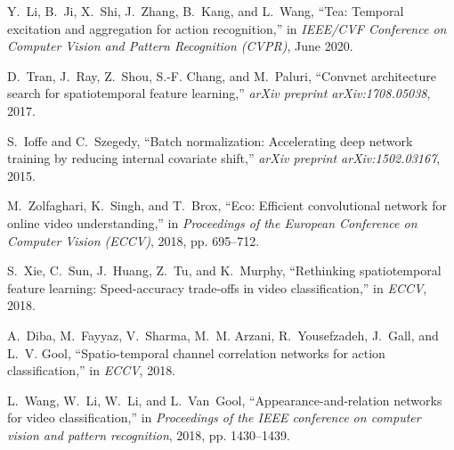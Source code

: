 \documentclass[journal]{IEEEtran}
\begin{document}
\begin{thebibliography}{10}
Y.~Li, B.~Ji, X.~Shi, J.~Zhang, B.~Kang, and L.~Wang, ``Tea: Temporal
  excitation and aggregation for action recognition,'' in \emph{IEEE/CVF
  Conference on Computer Vision and Pattern Recognition (CVPR)}, June 2020.

D.~Tran, J.~Ray, Z.~Shou, S.-F. Chang, and M.~Paluri, ``Convnet architecture
  search for spatiotemporal feature learning,'' \emph{arXiv preprint
  arXiv:1708.05038}, 2017.

S.~Ioffe and C.~Szegedy, ``Batch normalization: Accelerating deep network
  training by reducing internal covariate shift,'' \emph{arXiv preprint
  arXiv:1502.03167}, 2015.

M.~Zolfaghari, K.~Singh, and T.~Brox, ``{Eco: Efficient convolutional network
  for online video understanding},'' in \emph{Proceedings of the European
  Conference on Computer Vision (ECCV)}, 2018, pp. 695--712.

S.~Xie, C.~Sun, J.~Huang, Z.~Tu, and K.~Murphy, ``Rethinking spatiotemporal
  feature learning: Speed-accuracy trade-offs in video classification,'' in
  \emph{ECCV}, 2018.

A.~Diba, M.~Fayyaz, V.~Sharma, M.~M. Arzani, R.~Yousefzadeh, J.~Gall, and L.~V.
  Gool, ``Spatio-temporal channel correlation networks for action
  classification,'' in \emph{ECCV}, 2018.

L.~Wang, W.~Li, W.~Li, and L.~Van~Gool, ``Appearance-and-relation networks for
  video classification,'' in \emph{Proceedings of the IEEE conference on
  computer vision and pattern recognition}, 2018, pp. 1430--1439.

\end{thebibliography}























\clearpage



\end{document}
